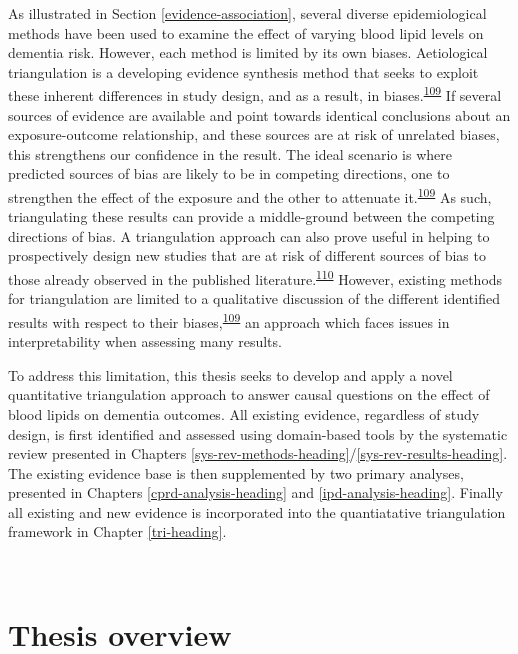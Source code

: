 \documentclass[a4paper, twoside]{templates/ociamthesis}
\begin{document}
As illustrated in Section \ref{evidence-association}, several diverse epidemiological methods have been used to examine the effect of varying blood lipid levels on dementia risk. However, each method is limited by its own biases. Aetiological triangulation is a developing evidence synthesis method that seeks to exploit these inherent differences in study design, and as a result, in biases.\textsuperscript{\protect\hyperlink{ref-lawlor2016}{109}} If several sources of evidence are available and point towards identical conclusions about an exposure-outcome relationship, and these sources are at risk of unrelated biases, this strengthens our confidence in the result. The ideal scenario is where predicted sources of bias are likely to be in competing directions, one to strengthen the effect of the exposure and the other to attenuate it.\textsuperscript{\protect\hyperlink{ref-lawlor2016}{109}} As such, triangulating these results can provide a middle-ground between the competing directions of bias. A triangulation approach can also prove useful in helping to prospectively design new studies that are at risk of different sources of bias to those already observed in the published literature.\textsuperscript{\protect\hyperlink{ref-munafo2018}{110}} However, existing methods for triangulation are limited to a qualitative discussion of the different identified results with respect to their biases,\textsuperscript{\protect\hyperlink{ref-lawlor2016}{109}} an approach which faces issues in interpretability when assessing many results.

To address this limitation, this thesis seeks to develop and apply a novel quantitative triangulation approach to answer causal questions on the effect of blood lipids on dementia outcomes. All existing evidence, regardless of study design, is first identified and assessed using domain-based tools by the systematic review presented in Chapters \ref{sys-rev-methods-heading}/\ref{sys-rev-results-heading}. The existing evidence base is then supplemented by two primary analyses, presented in Chapters \ref{cprd-analysis-heading} and \ref{ipd-analysis-heading}. Finally all existing and new evidence is incorporated into the quantiatative triangulation framework in Chapter \ref{tri-heading}.

~

\hypertarget{background-thesis-overview}{%
\section{Thesis overview}\label{background-thesis-overview}}
\end{document}
